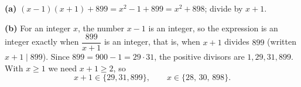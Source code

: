 \textbf{(a)} $(x-1)(x+1)+899=x^2-1+899=x^2+898$; divide by $x+1$.

\textbf{(b)} For an integer $x$, the number $x-1$ is an integer, so the expression is an integer exactly when $\dfrac{899}{x+1}$ is an integer, that is, when $x+1$ divides $899$ (written $x+1\mid899$). Since $899=900-1=29\cdot31$, the positive divisors are $1,29,31,899$. With $x\ge1$ we need $x+1\ge2$, so
\[x+1\in\{29,31,899\},\qquad x\in\boxed{\{28,\,30,\,898\}}.\]
